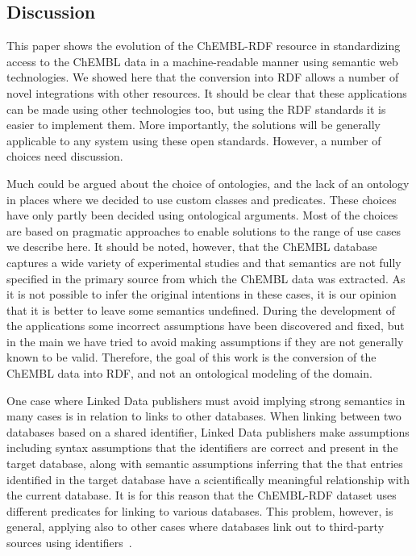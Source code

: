 \documentclass[10pt]{bmc_article}
\newenvironment{bmcformat}{\begin{raggedright}\baselineskip20pt\sloppy\setboolean{publ}{false}}{\end{raggedright}\baselineskip20pt\sloppy}
\begin{document}
\begin{bmcformat}
\section*{Discussion}

This paper shows the evolution of the ChEMBL-RDF resource in standardizing access to the
ChEMBL data in a machine-readable manner using semantic web technologies. We showed here
that the conversion into RDF allows a number of novel integrations with other resources.
It should be clear that these applications can be made using other technologies too, but
using the RDF standards it is easier to implement them. More importantly, the solutions
will be generally applicable to any system using these open standards. However, a number
of choices need discussion. 

Much could be argued about the choice of ontologies, and the lack of an
ontology in places where we decided to use custom classes and predicates. These
choices have only partly been decided using ontological arguments. Most of the choices are based
on pragmatic approaches to enable solutions to the range of use cases we describe here. It should be noted,
however, that the ChEMBL database captures a wide variety of experimental studies
and that semantics are not fully specified in the primary source from which the ChEMBL data was
extracted. As it is not possible to infer the original intentions in these cases, 
it is our opinion that it is better to leave some semantics undefined. During the 
development of the applications some incorrect assumptions have been discovered and
fixed, but in the main we have tried to avoid making assumptions if they are not generally known to be valid. 
Therefore, the goal of this work is the conversion of the ChEMBL data into
RDF, and not an ontological modeling of the domain.

One case where Linked Data publishers must avoid implying strong semantics in many cases is
in relation to links to other databases. When linking between two databases based on a shared identifier,
Linked Data publishers make assumptions including syntax assumptions that the identifiers 
are correct and present in the target database, along with semantic assumptions inferring that the
that entries identified in the target database have a scientifically meaningful relationship with the current database.
It is for this reason that the ChEMBL-RDF dataset uses different predicates for linking to various databases.
This problem, however, is general, applying also to other cases where databases link out to third-party sources using identifiers~\cite{VanIersel2010}.


\end{bmcformat}
\end{document}
